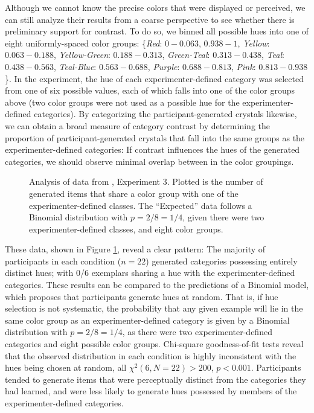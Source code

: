 \documentclass[12pt]{article}
\newcommand\inputpgf[2]{{
\let\pgfimageWithoutPath\pgfimage
\renewcommand{\pgfimage}[2][]{\pgfimageWithoutPath[##1]{#1/##2}}

}}
\begin{document}
\begin{flushleft}
Although we cannot know the precise colors that were displayed or perceived, we
can still analyze their results from a coarse perspective to see whether there
is preliminary support for contrast. To do so, we binned all possible hues into
one of eight uniformly-spaced color groups: \{{\em Red}: $0-0.063$, $0.938-1$,
{\em Yellow}: $0.063-0.188$, {\em Yellow-Green}: $0.188-0.313$, {\em
	Green-Teal}: $0.313-0.438$, {\em Teal}: $0.438-0.563$, {\em Teal-Blue}:
$0.563-0.688$, {\em Purple}: $0.688-0.813$, {\em Pink}: $0.813-0.938$\}. In the
\cite{jern2013probabilistic} experiment, the hue of each experimenter-defined
category was selected from one of six possible values, each of which falls into
one of the color groups above (two color groups were not used as a possible hue
for the experimenter-defined categories). By categorizing the
participant-generated crystals likewise, we can obtain a broad measure of
category contrast by determining the proportion of participant-generated
crystals that fall into the same groups as the experimenter-defined categories:
If contrast influences the hues of the generated categories, we should observe
minimal overlap between in the color groupings.



\begin{figure}
	\begin{center} \inputpgf{figs/}{jk13-huecontrast.pgf}
		\caption{Analysis of data from \cite{jern2013probabilistic}, Experiment
			3. Plotted is the number of generated items that share a color group with one of
			the experimenter-defined classes. The ``Expected'' data follows a Binomial
			distribution with $p=2/8=1/4$, given there were two experimenter-defined
			classes, and eight color groups.}
		\label{fig:jk13-huecontrast}
	\end{center}
\end{figure}

These data, shown in Figure \ref{fig:jk13-huecontrast}, reveal a clear pattern:
The majority of participants in each condition ($n = 22$) generated categories
possessing entirely distinct hues; with 0/6 exemplars sharing a hue with the
experimenter-defined categories. These results can be compared to the
predictions of a Binomial model, which proposes that participants generate hues
at random. That is, if hue selection is not systematic, the probability that any
given example will lie in the same color group as an experimenter-defined
category is given by a Binomial distribution with $p = 2/8=1/4$, as there were
two experimenter-defined categories and eight possible color groups. Chi-square
goodness-of-fit tests reveal that the observed distribution in each condition is
highly inconsistent with the hues being chosen at random, all
$\chi^2(6,N=22)>200$, $p<0.001$. Participants tended to generate items that were
perceptually distinct from the categories they had learned, and were less likely
to generate hues possessed by members of the experimenter-defined categories.


\end{flushleft}
\end{document}
